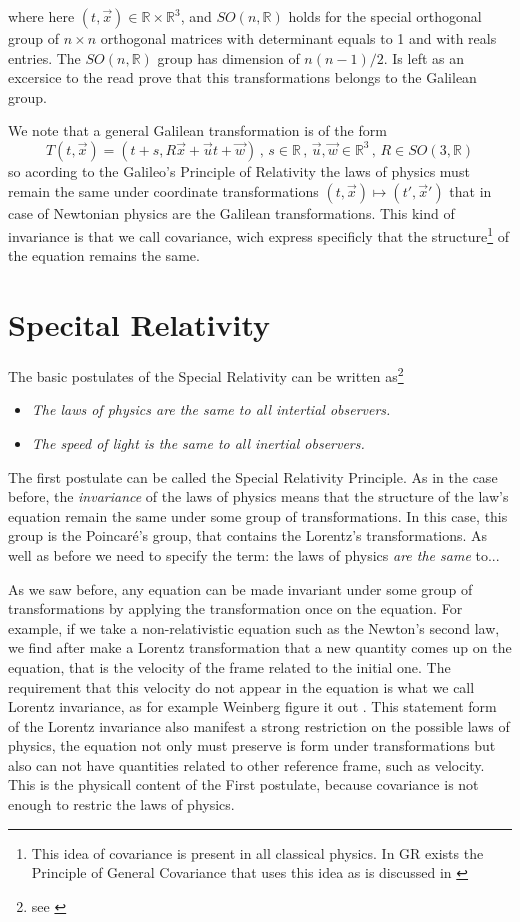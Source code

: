 \documentclass[10pt, letterpaper, oneside]{book}
\theoremstyle{theorem} %
\theoremstyle{theorem} %
\theoremstyle{definition}
\theoremstyle{remark}
\theoremstyle{definition}
\theoremstyle{definition}
\theoremstyle{theorem}
\def\Re{\mathbb{R}}
\begin{document}
where here $(t,\vec{x})\in \Re\times\Re^3$, and $SO(n,\Re)$ holds for the special orthogonal group of $n\times n$ orthogonal matrices with determinant equals to 1 and with reals entries. The $SO(n,\Re)$ group has dimension of $n(n-1)/2$. Is left as an excersice to the read prove that this transformations belongs to the Galilean group. 

We note that a general Galilean transformation is of the form
\begin{equation}
	T(t,\vec{x})=(t+s,R\vec{x}+\vec{u}t+\vec{w})\,,\, s\in\Re\,,\,\vec{u},\vec{w}\in\Re^3\,,\,R\in SO(3,\Re) \label{eq:generalT}
\end{equation}
so acording to the Galileo's Principle of Relativity the laws of physics must remain the same under coordinate transformations $(t,\vec{x})\mapsto (t',\vec{x}')$ that in case of Newtonian physics are the Galilean transformations. This kind of invariance is that we call covariance, wich express specificly that the structure\footnote{This idea of covariance is present in all classical physics. In GR exists the Principle of General Covariance that uses this idea as is discussed in \cite{weinberg}} of the equation remains the same.

\section{Specital Relativity}
The basic postulates of the Special Relativity can be written as\footnote{see \cite{goldstein}}
\begin{itemize}
	\item[\textit{1.}] \textit{The laws of physics are the same to all intertial observers.}
	\item[\textit{2.}] \textit{The speed of light is the same to all inertial observers.}
\end{itemize}

The first postulate can be called the Special Relativity Principle. As in the case before, the \textit{invariance} of the laws of physics means that the structure of the law's equation remain the same under some group of transformations. In this case, this group is the Poincaré's group, that contains the Lorentz's transformations. As well as before we need to specify the term: the laws of physics \textit{are the same} to...

As we saw before, any equation can be made invariant under some group of transformations by applying the transformation once on the equation. For example, if we take a non-relativistic equation such as the Newton's second law, we find after make a Lorentz transformation that a new quantity comes up on the equation, that is the velocity of the frame related to the initial one. The requirement that this velocity do not appear in the equation is what we call Lorentz invariance, as for example Weinberg figure it out \cite{weinberg}. This statement form of the Lorentz invariance also manifest a strong restriction on the possible laws of physics, the equation not only must preserve is form under transformations but also can not have quantities related to other reference frame, such as velocity. This is the physicall content of the First postulate, because covariance is not enough to restric the laws of physics.
\end{document}
